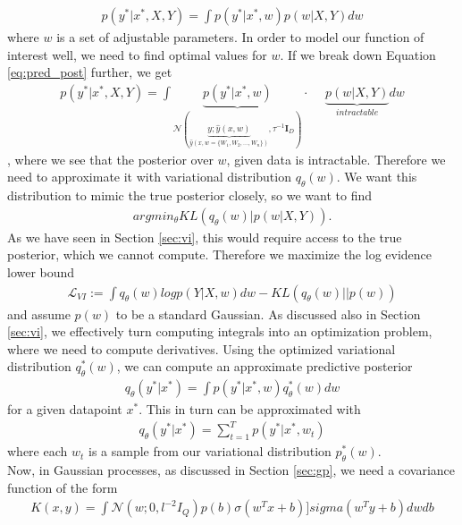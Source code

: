 \documentclass[a4paper,cleardoubleempty,BCOR1cm, 11pt]{report}
\begin{document}
\begin{align}\label{eq:pred_post}
 p(y^*|x^*, X,Y) = \int p(y^*|x^*, w)p(w|X,Y)dw
\end{align}
where $w$ is a set of adjustable parameters. In order to model our function of interest well, we need to find optimal values for $w$. If we break down Equation \ref{eq:pred_post} further, we get
\begin{align}
p(y^*|x^*, X,Y) = \int \underbrace{p(y^*|x^*,w)}_{\mathcal{N}(\underbrace{y;\hat{y}(x,w)}_{\hat{y}(x, w=\lbrace W_1, W_2,...,W_n\rbrace)},\tau^{-1}\mathbf{I}_D)} \cdot \hspace{15pt}\underbrace{p(w|X,Y)}_{intractable}dw
\end{align}
, where we see that the posterior over $w$, given data is intractable. Therefore we need to approximate it with variational distribution $q_{\theta}(w)$. We want this distribution to mimic the true posterior closely, so we want to find
\begin{align*}
	argmin_{\theta} KL(q_{\theta}(w)|p(w|X,Y)).
\end{align*}
As we have seen in Section \ref{sec:vi}, this would require access to the true posterior, which we cannot compute. Therefore we maximize the log evidence lower bound
\begin{align*}
\mathcal{L}_{VI} := \int q_{\theta}(w) log p (Y|X, w)dw - KL(q_{\theta}(w)||p(w))
\end{align*}
and assume $p(w)$ to be a standard Gaussian. As discussed also in Section \ref{sec:vi}, we effectively turn computing integrals into an optimization problem, where we need to compute derivatives. Using the optimized variational distribution $q_{\theta}^*(w)$, we can compute an approximate predictive posterior 
\begin{align*}
q_{\theta}(y^*|x^*) = \int p(y^*|x^*, w)q_{\theta}^*(w)dw
\end{align*}
for a given datapoint $x^*$. This in turn can be approximated with
\begin{align*}
q_{\theta}(y^*|x^*) = \sum_{t=1}^{T}p(y^*|x^*, w_t)
\end{align*}
where each $w_t$ is a sample from our variational distribution $p_{\theta}^*(w)$.
\\
Now, in Gaussian processes, as discussed in Section \ref{sec:gp}, we need a covariance function of the form 
\begin{align*}
K(x,y) = \int \mathcal{N}(w;0, l^{-2} I_Q)p(b)\sigma(w^Tx+b)]sigma(w^Ty +b)dwdb
\end{align*}
\end{document}
